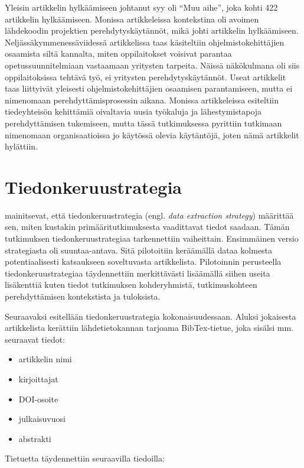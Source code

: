 \documentclass[utf8]{gradu3}
\begin{document}
Yleisin artikkelin hylkäämiseen johtanut syy oli ``Muu aihe'', joka kohti 422 artikkelin hylkäämiseen. Monissa artikkeleissa kontekstina oli avoimen lähdekoodin projektien perehdytyskäytännöt, mikä johti artikkelin hylkäämiseen. Neljässäkymmenessäviidessä artikkelissa taas käsiteltiin ohjelmistokehittäjien osaamista siltä kannalta, miten oppilaitokset voisivat parantaa opetussuunnitelmiaan vastaamaan yritysten tarpeita. Näissä näkökulmana oli siis oppilaitoksissa tehtävä työ, ei yritysten perehdytyskäytännöt. Useat artikkelit taas liittyivät yleisesti ohjelmistokehittäjien osaamisen parantamiseen, mutta ei nimenomaan perehdyttämisprosessin aikana. Monissa artikkeleissa esiteltiin tiedeyhteisön kehittämiä oivaltavia uusia työkaluja ja lähestymistapoja perehdyttämisen tukemiseen, mutta tässä tutkimuksessa pyrittiin tutkimaan nimenomaan organisaatioissa jo käytössä olevia käytäntöjä, joten nämä artikkelit hylättiin.

\section{Tiedonkeruustrategia}
\label{luku-tiedonkeruustrategia}

\textcite{kitchenham-charters-2007} mainitsevat, että tiedonkeruustrategia (engl. \textit{data extraction strategy}) määrittää sen, miten kustakin primääritutkimuksesta vaadittavat tiedot saadaan. Tämän tutkimuksen tiedonkeruustrategiaa tarkennettiin vaiheittain. Ensimmäinen versio strategiasta oli suuntaa-antava. Sitä pilotoitiin keräämällä dataa kolmesta potentiaalisesti katsaukseen soveltuvasta artikkelista. Pilotoinnin perusteella tiedonkeruustrategiaa täydennettiin merkittävästi lisäämällä siihen useita lisäkenttiä kuten tiedot tutkimuksen kohderyhmistä, tutkimuskohteen perehdyttämisen kontekstista ja tuloksista.

Seuraavaksi esitellään tiedonkeruustrategia kokonaisuudessaan. Aluksi jokaisesta artikkelista kerättiin lähdetietokannan tarjoama BibTex-tietue, joka sisälsi mm. seuraavat tiedot:

\begin{itemize}
    \item artikkelin nimi
    \item kirjoittajat
    \item DOI-osoite
    \item julkaisuvuosi
    \item abstrakti
\end{itemize}

Tietuetta täydennettiin seuraavilla tiedoilla:
\end{document}
